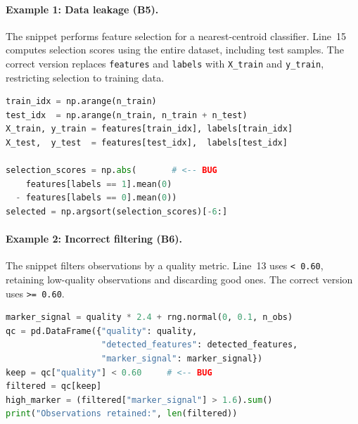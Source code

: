 \documentclass[11pt]{article}
\begin{document}
\paragraph{Example 1: Data leakage (B5).}
The snippet performs feature selection for a nearest-centroid classifier. Line~15 computes selection scores using the entire dataset, including test samples. The correct version replaces \texttt{features} and \texttt{labels} with \texttt{X\_train} and \texttt{y\_train}, restricting selection to training data.
\begin{lstlisting}[language=Python,firstnumber=10]
train_idx = np.arange(n_train)
test_idx  = np.arange(n_train, n_train + n_test)
X_train, y_train = features[train_idx], labels[train_idx]
X_test,  y_test  = features[test_idx],  labels[test_idx]

selection_scores = np.abs(       # <-- BUG
    features[labels == 1].mean(0)
  - features[labels == 0].mean(0))
selected = np.argsort(selection_scores)[-6:]
\end{lstlisting}

\paragraph{Example 2: Incorrect filtering (B6).}
The snippet filters observations by a quality metric. Line~13 uses \texttt{< 0.60}, retaining low-quality observations and discarding good ones. The correct version uses \texttt{>= 0.60}.
\begin{lstlisting}[language=Python,firstnumber=9]
marker_signal = quality * 2.4 + rng.normal(0, 0.1, n_obs)
qc = pd.DataFrame({"quality": quality,
                   "detected_features": detected_features,
                   "marker_signal": marker_signal})
keep = qc["quality"] < 0.60     # <-- BUG
filtered = qc[keep]
high_marker = (filtered["marker_signal"] > 1.6).sum()
print("Observations retained:", len(filtered))
\end{lstlisting}
\end{document}
